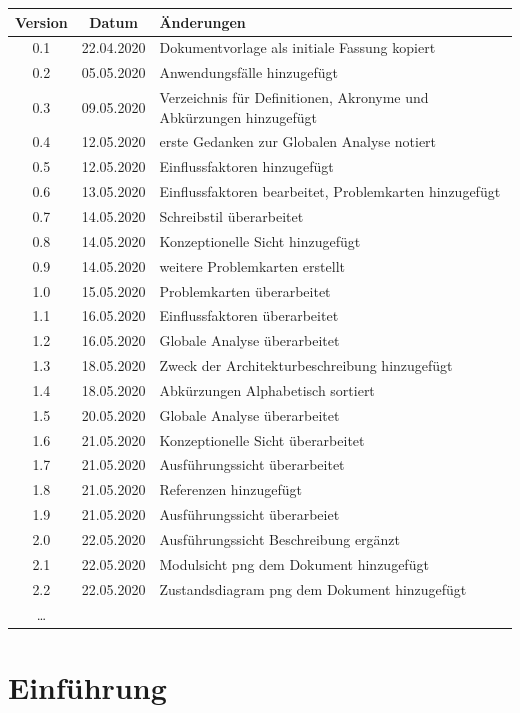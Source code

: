 \documentclass[fontsize=12pt,paper=a4,twoside]{scrartcl}
\begin{document}
\begin{tabular}{ccl}
Version & Datum & Änderungen \\
\hline
0.1 & 22.04.2020 & Dokumentvorlage als initiale Fassung kopiert \\
0.2 & 05.05.2020 &  Anwendungsfälle hinzugefügt\\
0.3 & 09.05.2020 & Verzeichnis für Definitionen, Akronyme und Abkürzungen hinzugefügt \\
0.4 & 12.05.2020 & erste Gedanken zur Globalen Analyse  notiert\\
0.5 & 12.05.2020 & Einflussfaktoren hinzugefügt\\
0.6 & 13.05.2020 & Einflussfaktoren bearbeitet, Problemkarten hinzugefügt\\
0.7 & 14.05.2020 & Schreibstil überarbeitet\\
0.8 & 14.05.2020 & Konzeptionelle Sicht hinzugefügt\\
0.9 & 14.05.2020 & weitere Problemkarten erstellt\\
1.0 & 15.05.2020 & Problemkarten überarbeitet\\
1.1 & 16.05.2020 & Einflussfaktoren überarbeitet\\
1.2 & 16.05.2020 & Globale Analyse überarbeitet\\
1.3 & 18.05.2020 & Zweck der Architekturbeschreibung hinzugefügt\\
1.4 & 18.05.2020 & Abkürzungen Alphabetisch sortiert\\
1.5 & 20.05.2020 & Globale Analyse überarbeitet\\
1.6 & 21.05.2020 & Konzeptionelle Sicht überarbeitet\\
1.7 & 21.05.2020 & Ausführungssicht  überarbeitet\\
1.8 & 21.05.2020 & Referenzen hinzugefügt\\
1.9 & 21.05.2020 & Ausführungssicht überarbeiet\\
2.0 & 22.05.2020 & Ausführungssicht Beschreibung ergänzt\\
2.1 & 22.05.2020 & Modulsicht png dem Dokument hinzugefügt\\
2.2 & 22.05.2020 & Zustandsdiagram png dem Dokument hinzugefügt\\




\ldots
\end{tabular}


\section{Einführung}
\end{document}
